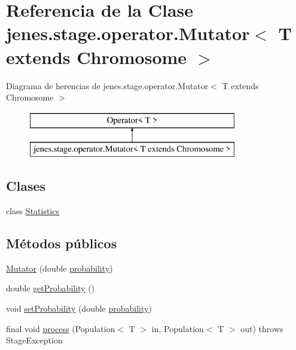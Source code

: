 \hypertarget{classjenes_1_1stage_1_1operator_1_1_mutator_3_01_t_01extends_01_chromosome_01_4}{\section{Referencia de la Clase jenes.\-stage.\-operator.\-Mutator$<$ T extends Chromosome $>$}
\label{classjenes_1_1stage_1_1operator_1_1_mutator_3_01_t_01extends_01_chromosome_01_4}
}
Diagrama de herencias de jenes.\-stage.\-operator.\-Mutator$<$ T extends Chromosome $>$\begin{figure}[H]
\begin{center}
\leavevmode
\includegraphics[height=2.000000cm]{classjenes_1_1stage_1_1operator_1_1_mutator_3_01_t_01extends_01_chromosome_01_4}
\end{center}
\end{figure}
\subsection*{Clases}
\begin{DoxyCompactItemize}
\item 
class \hyperlink{classjenes_1_1stage_1_1operator_1_1_mutator_3_01_t_01extends_01_chromosome_01_4_1_1_statistics}{Statistics}
\end{DoxyCompactItemize}
\subsection*{Métodos públicos}
\begin{DoxyCompactItemize}
\item 
\hyperlink{classjenes_1_1stage_1_1operator_1_1_mutator_3_01_t_01extends_01_chromosome_01_4_a01aea5c94d65f99cca8a24be7250a06a}{Mutator} (double \hyperlink{classjenes_1_1stage_1_1operator_1_1_mutator_3_01_t_01extends_01_chromosome_01_4_a60f38eb7afd1ad6a7d1c0c639df2d5fe}{probability})
\item 
double \hyperlink{classjenes_1_1stage_1_1operator_1_1_mutator_3_01_t_01extends_01_chromosome_01_4_af8cd41f87d99e8bc5d00bf9a21ffcd86}{get\-Probability} ()
\item 
void \hyperlink{classjenes_1_1stage_1_1operator_1_1_mutator_3_01_t_01extends_01_chromosome_01_4_a49b8a34032a575badd2080d6c90397cb}{set\-Probability} (double \hyperlink{classjenes_1_1stage_1_1operator_1_1_mutator_3_01_t_01extends_01_chromosome_01_4_a60f38eb7afd1ad6a7d1c0c639df2d5fe}{probability})
\item 
final void \hyperlink{classjenes_1_1stage_1_1operator_1_1_mutator_3_01_t_01extends_01_chromosome_01_4_a091269db32219198b26860ee4b295345}{process} (Population$<$ T $>$ in, Population$<$ T $>$ out)  throws Stage\-Exception 
\end{DoxyCompactItemize}
